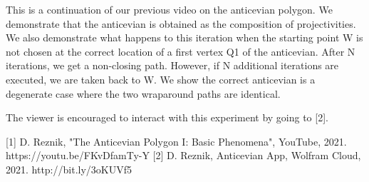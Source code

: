 This is a continuation of our previous video on the anticevian polygon. We demonstrate that the anticevian is obtained as the composition of projectivities. We also demonstrate what happens to this iteration when the starting point W is not chosen at the correct location of a first vertex Q1 of the anticevian. After N iterations, we get a non-closing path. However, if N additional iterations are executed, we are taken back to W. We show the correct anticevian is a degenerate case where the two wraparound paths are identical.

The viewer is encouraged to interact with this experiment by going to [2].

[1] D. Reznik, "The Anticevian Polygon I: Basic Phenomena", YouTube, 2021. https://youtu.be/FKvDfamTy-Y
[2] D. Reznik, Anticevian App, Wolfram Cloud, 2021. http://bit.ly/3oKUVf5